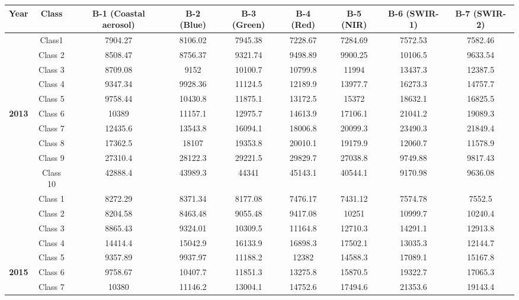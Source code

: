 \documentclass[final,5p,times,twocolumn]{elsarticle}
\begin{document}
\begin{table}[ht!]
  \centering
  \footnotesize
  \begin{tabular}{| ccccccccc |}
    \textbf{Year} & \textbf{Class} & \textbf{B-1 (Coastal aerosol)} & \textbf{B-2 (Blue)} & \textbf{B-3 (Green)} & \textbf{B-4 (Red)} & \textbf{B-5 (NIR)} & \textbf{B-6 (SWIR-1)} & \textbf{B-7 (SWIR-2)}\\
    \toprule
    & Class1 & 7904.27 & 8106.02 & 7945.38 & 7228.67 & 7284.69 & 7572.53 & 7582.46 \\
    & Class 2 & 8508.47 & 8756.37 & 9321.74 & 9498.89 & 9900.25 & 10106.5 & 9633.54 \\
   & Class 3 & 8709.08 & 9152 & 10100.7 & 10799.8 & 11994 & 13437.3 & 12387.5 \\
    & Class 4 & 9347.34 & 9928.36 & 11124.5 & 12189.9 & 13977.7 & 16273.3 & 14757.7 \\
    & Class 5 & 9758.44 & 10430.8 & 11875.1 & 13172.5 & 15372 & 18632.1 & 16825.5\\
    \textbf{2013} & Class 6 & 10389 & 11157.1 & 12975.7 & 14613.9 & 17106.1 & 21041.2 & 19089.3\\
     & Class 7 & 12435.6 & 13543.8 & 16094.1 & 18006.8 & 20099.3 & 23490.3 & 21849.4\\
     & Class 8 & 17362.5 & 18107 & 19353.8 & 20010.1 & 19179.9 & 12060.7 & 11578.9\\
     & Class 9 & 27310.4 & 28122.3 & 29221.5 & 29829.7 & 27038.8 & 9749.88 & 9817.43\\
    & Class 10 & 42888.4 & 43989.3 & 44341 & 45143.1 & 40544.1 & 9170.98 & 9636.08\\
    \midrule
     & Class 1 & 8272.29 & 8371.34 & 8177.08 & 7476.17 & 7431.12 & 7574.78 & 7552.5 \\
     & Class 2 & 8204.58 & 8463.48 & 9055.48 & 9417.08 & 10251 & 10999.7 & 10240.4 \\
     & Class 3 & 8865.43 & 9324.01 & 10309.5 & 11164.8 & 12710.3 & 14291.1 & 12913.8 \\
     & Class 4 & 14414.4 & 15042.9 & 16133.9 & 16898.3 & 17502.1 & 13035.3 & 12144.7 \\
     & Class 5 & 9357.89 & 9937.97 & 11188.2 & 12382 & 14588.3 & 17089.1 & 15167.8 \\
     \textbf{2015} & Class 6 & 9758.67 & 10407.7 & 11851.3 & 13275.8 & 15870.5 & 19322.7 & 17065.3 \\
     & Class 7 & 10380 & 11146.2 & 13004.1 & 14752.6 & 17494.6 & 21353.6 & 19143.4 \\

\end{tabular}
\end{table}
\end{document}
